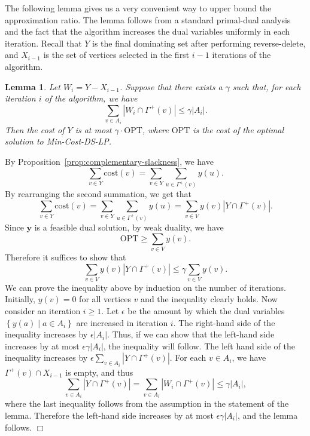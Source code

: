 \documentclass[11pt]{article}
\newtheorem{lemma}{Lemma}[section]
\renewenvironment{proof}{\vspace{-0.1in}\noindent{\bf Proof:}}{\hspace*{\fill}$\Box$\par}
\def\opt{\mathrm{OPT}}
\def\card#1{\left|#1\right|}
\def\set#1{\left\{#1\right\}}
\def\sep{\;|\;}
\def\prob#1{\textsf{\textup{#1}}\xspace}
\def\minDSlp{\prob{\minDS-LP}}
\def\minDS{\prob{Min-Cost-DS}}
\def\cost{\mathrm{cost}}
\def\vy{\mathrm{\mathbf{y}}}
\begin{document}
\noindent
The following lemma gives us a very convenient way to upper bound the
approximation ratio. The lemma follows from a standard primal-dual
analysis and the fact that the algorithm increases the dual variables
uniformly in each iteration. Recall that $Y$ is the final dominating
set after performing reverse-delete, and $X_{i - 1}$ is the set of
vertices selected in the first $i - 1$ iterations of the algorithm.

\begin{lemma} \label{lem:approx-condition}
	Let $W_i = Y - X_{i - 1}$. Suppose that there exists a $\gamma$
	such that, for each iteration $i$ of the algorithm, we have
		$$\sum_{v \in A_i} \card{W_i \cap \Gamma^+(v)} \leq \gamma
		\card{A_i}.$$
	Then the cost of $Y$ is at most $\gamma \cdotp \opt$, where
	$\opt$ is the cost of the optimal solution to \minDSlp.
\end{lemma}
\begin{proof}
	By Proposition~\ref{prop:complementary-slackness}, we have
		$$\sum_{v \in Y} \cost(v) = \sum_{v \in Y} \sum_{u \in
		\Gamma^+(v)} y(u).$$
	By rearranging the second summation, we get that
		$$\sum_{v \in Y} \cost(v) = \sum_{v \in Y} \sum_{u \in
		\Gamma^+(v)} y(u) = \sum_{v \in V} y(v) \card{Y \cap
		\Gamma^+(v)}.$$
	Since $\vy$ is a feasible dual solution, by weak duality, we have
		$$\opt \geq \sum_{v \in V} y(v).$$
	Therefore it suffices to show that
		$$\sum_{v \in V} y(v) \card{Y \cap \Gamma^+(v)} \leq
		\gamma \sum_{v \in V} y(v).$$
	We can prove the inequality above by induction on the number of
	iterations. Initially, $y(v) = 0$ for all vertices $v$ and the
	inequality clearly holds. Now consider an iteration $i \geq 1$.
	Let $\epsilon$ be the amount by which the dual variables
	$\set{y(a) \sep a \in A_i}$ are increased in iteration $i$. The
	right-hand side of the inequality increases by $\epsilon
	\card{A_i}$. Thus, if we can show that the left-hand side
	increases by at most $\epsilon \gamma \card{A_i}$, the inequality
	will follow. The left hand side of the inequality
	increases by $\epsilon \sum_{v \in A_i} \card{Y \cap
	\Gamma^+(v)}$. For each $v \in A_i$, we have $\Gamma^+(v) \cap
	X_{i - 1}$ is empty, and thus
		$$\sum_{v \in A_i} \card{Y \cap \Gamma^+(v)} = \sum_{v \in
		A_i} \card{W_i \cap \Gamma^+(v)} \leq \gamma \card{A_i},$$
	where the last inequality follows from the assumption in the
	statement of the lemma. Therefore the left-hand side increases by
	at most $\epsilon \gamma \card{A_i}$, and the lemma follows.
\end{proof}
\end{document}
